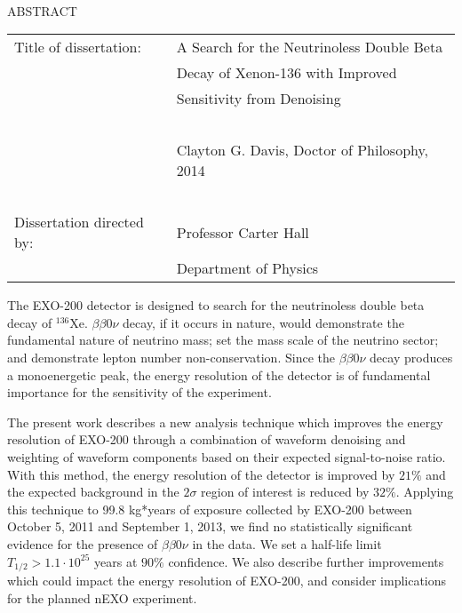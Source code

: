 
\hbox{\ }

\renewcommand{\baselinestretch}{1}
\small \normalsize

\begin{center}
\large{{ABSTRACT}} 

\vspace{3em} 

\end{center}
\hspace{-.15in}
\begin{tabular}{ll}
Title of dissertation:    & {\large A Search for the Neutrinoless Double Beta}\\
&                           {\large Decay of Xenon-136 with Improved} \\
&                           {\large Sensitivity from Denoising} \\
\ \\
&                          {\large  Clayton G. Davis, Doctor of Philosophy, 2014} \\
\ \\
Dissertation directed by: & {\large  Professor Carter Hall} \\
&  				{\large	 Department of Physics } \\
\end{tabular}

\vspace{3em}

\renewcommand{\baselinestretch}{2}
\large \normalsize

The EXO-200 detector is designed to search for the neutrinoless double beta decay of $^{136}$Xe.  $\beta\beta 0\nu$ decay, if it occurs in nature, would demonstrate the fundamental nature of neutrino mass; set the mass scale of the neutrino sector; and demonstrate lepton number non-conservation.  Since the $\beta\beta 0\nu$ decay produces a monoenergetic peak, the energy resolution of the detector is of fundamental importance for the sensitivity of the experiment.

The present work describes a new analysis technique which improves the energy resolution of EXO-200 through a combination of waveform denoising and weighting of waveform components based on their expected signal-to-noise ratio. With this method, the energy resolution of the detector is improved by $21\%$ and the expected background in the $2\sigma$ region of interest is reduced by $32\%$.  Applying this technique to 99.8 kg*years of exposure collected by EXO-200 between October 5, 2011 and September 1, 2013, we find no statistically significant evidence for the presence of $\beta\beta 0\nu$ in the data. We set a half-life limit $T_{1/2} > 1.1 \cdot 10^{25}$ years at $90\%$ confidence.  We also describe further improvements which could impact the energy resolution of EXO-200, and consider implications for the planned nEXO experiment.
